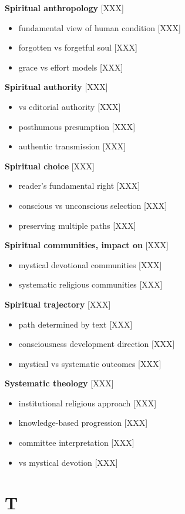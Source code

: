 \documentclass[11pt,twoside]{book}
\begin{document}
\textbf{\textbf{Spiritual anthropology}} {[}XXX]
\begin{itemize}
\item fundamental view of human condition [XXX]
\item forgotten vs forgetful soul [XXX]
\item grace vs effort models [XXX]
\end{itemize}

\textbf{\textbf{Spiritual authority}} {[}XXX]
\begin{itemize}
\item vs editorial authority [XXX]
\item posthumous presumption [XXX]
\item authentic transmission [XXX]
\end{itemize}

\textbf{\textbf{Spiritual choice}} {[}XXX]
\begin{itemize}
\item reader's fundamental right [XXX]
\item conscious vs unconscious selection [XXX]
\item preserving multiple paths [XXX]
\end{itemize}

\textbf{\textbf{Spiritual communities, impact on}} {[}XXX]
\begin{itemize}
\item mystical devotional communities [XXX]
\item systematic religious communities [XXX]
\end{itemize}

\textbf{\textbf{Spiritual trajectory}} {[}XXX]
\begin{itemize}
\item path determined by text [XXX]
\item consciousness development direction [XXX]
\item mystical vs systematic outcomes [XXX]
\end{itemize}

\textbf{\textbf{Systematic theology}} {[}XXX]
\begin{itemize}
\item institutional religious approach [XXX]
\item knowledge-based progression [XXX]
\item committee interpretation [XXX]
\item vs mystical devotion [XXX]
\end{itemize}
\section*{T}
\label{sec:org00b195c}
\end{document}
